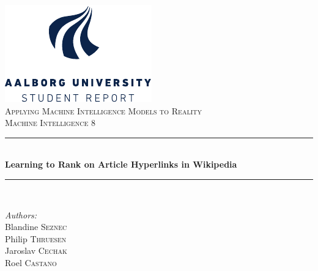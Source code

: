 \begin{titlepage}

\newcommand{\HRule}{\rule{\linewidth}{0.5mm}} %

\center %
 
 \includegraphics{images/aau_logo_en-eps-converted-to.pdf}\\[1cm] %



\textsc{\Large Applying Machine Intelligence Models to Reality}\\[0.5cm] %
\textsc{\large Machine Intelligence 8}\\[0.5cm] %

\HRule \\[0.4cm]
{ \huge \bfseries Learning to Rank on Article Hyperlinks in Wikipedia}\\[0.4cm] %
\HRule \\[1.5cm]
 

\begin{minipage}{0.4\textwidth}
\begin{flushleft} \large
\emph{Authors:}\\
Blandine  \textsc{Seznec} \\%
Philip   \textsc{Thruesen} \\%
Jaroslav   \textsc{Cechak} \\%
Roel   \textsc{Castano} \\ %


\end{flushleft}
\end{minipage}
\end{titlepage}

